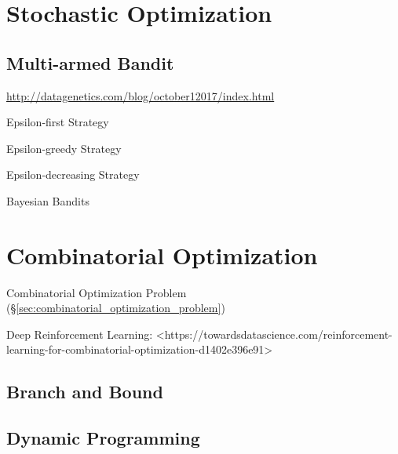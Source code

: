 \section{Stochastic Optimization}\label{sec:stochastic_optimization}

\subsection{Multi-armed Bandit}\label{sec:multiarmed_bandit}

\url{http://datagenetics.com/blog/october12017/index.html}

Epsilon-first Strategy

Epsilon-greedy Strategy

Epsilon-decreasing Strategy

Bayesian Bandits



\section{Combinatorial Optimization}\label{sec:combinatorial_optimization}

\fist Combinatorial Optimization Problem
(\S\ref{sec:combinatorial_optimization_problem})

Deep Reinforcement Learning:
<https://towardsdatascience.com/reinforcement-learning-for-combinatorial-optimization-d1402e396e91>



\subsection{Branch and Bound}\label{sec:branch_and_bound}

\subsection{Dynamic Programming}\label{sec:dynamic_programming}

